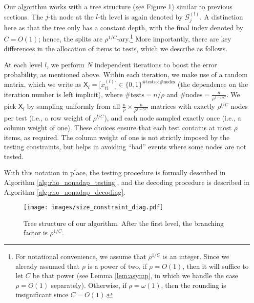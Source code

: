 Our algorithm works with a tree structure (see Figure \ref{fig:size_constraint_diagram}) similar to previous sections.  The $j$-th node at the $l$-th level is again denoted by $\mathcal{G}_j^{(l)}$.  A distinction here as that the tree only has a constant depth, with the final index denoted by $C = O(1)$; hence, the splits are $\rho^{1/C}$-ary.\footnote{For notational convenience, we assume that $\rho^{1/C}$ is an integer. Since we already assumed that $\rho$ is a power of two, if $\rho=O(1)$, then it will suffice to let $C$ be that power (see Lemma \ref{lem:asymp}, in which we handle the case $\rho = O(1)$ separately). Otherwise, if $\rho = \omega(1)$, then the rounding is insignificant since $C = O(1)$.}  More importantly, there are key differences in the allocation of items to tests, which we describe as follows.  

At each level $l$, we perform $N$ independent iterations to boost the error probability, as mentioned above.  Within each iteration, we make use of a random matrix, which we write as $\mathsf{X}_l=\big[x_{ti}^{(l)}\big]\in\{0,1\}^{\text{\#tests}\times\text{\#nodes}}$ (the dependence on the iteration number is left implicit), where $\text{\#tests}=n/\rho$ and $\text{\#nodes}=\frac{n}{\rho^{1-l/C}}$. We pick $\mathsf{X}_l$ by sampling uniformly from all $\frac{n}{\rho}\times\frac{n}{\rho^{1-l/C}}$ matrices with exactly $\rho^{l/C}$ nodes per test (i.e., a row weight of $\rho^{l/C}$), and each node sampled exactly once (i.e., a column weight of one).  These choices ensure that each test contains at most $\rho$ items, as required.  The column weight of one is not strictly imposed by the testing constraints, but helps in avoiding ``bad'' events where some nodes are not tested.

With this notation in place, the testing procedure is formally described in Algorithm \ref{alg:rho_nonadap_testing}, and the decoding  procedure is described in Algorithm \ref{alg:rho_nonadap_decoding}.

\begin{figure}[!t]
  \centering
  \texttt{[image: images/size\_constraint\_diag.pdf]}
  \caption{Tree structure of our algorithm. After the first level, the branching factor is $\rho^{1/C}$.} \vspace*{-2ex} \label{fig:size_constraint_diagram}
\end{figure}

